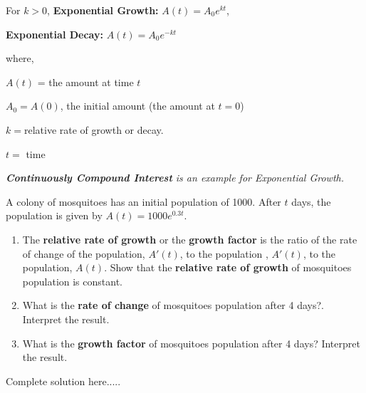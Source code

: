 \begin{tcolorbox}[title={Review: Model for Exponential Growth or Decay}]

For $k >0$,
\textbf{Exponential Growth:} $A(t) = A_0e^{kt}$,

\textbf{Exponential Decay:} $A(t) = A_0 e^{-kt}$

where,

$A(t)$ = the amount at time $t$

$A_0 = A(0)$, the initial amount (the amount at $t=0$)

$k = $relative rate of growth or decay.

$t=$ time

\textit{\textbf{Continuously Compound Interest} is an example for Exponential Growth.}

\end{tcolorbox}

\begin{example}
A colony of mosquitoes has an initial population of 1000. After $t$ days, the population is given by $A(t)=1000e^{0.3t}$. 
\renewcommand{\labelenumi}{\textbf{(\alph{enumi})}}
\begin{enumerate}[leftmargin=*]
\item The \textbf{relative rate of growth} or the \textbf{growth factor} is the ratio of the rate of change of the population, $A'(t)$, to the population , $A'(t)$, to the population, $A(t)$. Show that the \textbf{relative rate of growth} of  mosquitoes population is constant.
\item What is the \textbf{rate of change} of mosquitoes population after 4 days?. Interpret the result.
\item What is the \textbf{growth factor} of mosquitoes population after 4 days? Interpret the result. 
\newpage

\end{enumerate}
    \begin{sol}
    
    \end{sol}
    \begin{solL}
    Complete solution here.....
    
    \end{solL}
    
\end{example}

